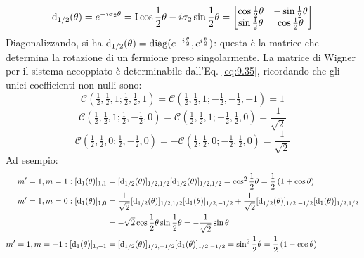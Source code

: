 \begin{equation*}
	\mathrm{d}_{1/2}(\theta) = e^{-i \sigma_2 \theta} = \mathrm{I} \cos \frac{1}{2} \theta - i \sigma_2 \sin \frac{1}{2} \theta =
	\begin{bmatrix}
		\cos \frac{1}{2} \theta & -\sin \frac{1}{2} \theta \\
		\sin \frac{1}{2} \theta & \cos \frac{1}{2} \theta
	\end{bmatrix}
\end{equation*}
Diagonalizzando, si ha $ \mathrm{d}_{1/2}(\theta) = \operatorname{diag} ( e^{- i \frac{\theta}{2}}, e^{i \frac{\theta}{2}} ) $: questa è la matrice che determina la rotazione di un fermione preso singolarmente. La matrice di Wigner per il sistema accoppiato è determinabile dall'Eq. \ref{eq:9.35}, ricordando che gli unici coefficienti non nulli sono:
\begin{equation*}
	\mathcal{C}(\tfrac{1}{2},\tfrac{1}{2},1 ; \tfrac{1}{2},\tfrac{1}{2},1) = \mathcal{C}(\tfrac{1}{2},\tfrac{1}{2},1 ; -\tfrac{1}{2},-\tfrac{1}{2},-1) = 1
\end{equation*}
\begin{equation*}
	\mathcal{C}(\tfrac{1}{2},\tfrac{1}{2},1 ; \tfrac{1}{2},-\tfrac{1}{2},0) = \mathcal{C}(\tfrac{1}{2},\tfrac{1}{2},1 ; -\tfrac{1}{2},\tfrac{1}{2},0) = \frac{1}{\sqrt{2}}
\end{equation*}
\begin{equation*}
	\mathcal{C}(\tfrac{1}{2},\tfrac{1}{2},0 ; \tfrac{1}{2},-\tfrac{1}{2},0) = - \mathcal{C}(\tfrac{1}{2},\tfrac{1}{2},0 ; -\tfrac{1}{2},\tfrac{1}{2},0) = \frac{1}{\sqrt{2}}
\end{equation*}
Ad esempio:
\begin{align*}
	m' = 1, m = 1: [\mathrm{d}_1(\theta)]_{1,1} &= [\mathrm{d}_{1/2}(\theta)]_{1/2,1/2} [\mathrm{d}_{1/2}(\theta)]_{1/2,1/2} = \cos^2 \frac{1}{2} \theta = \frac{1}{2} \left( 1 + \cos \theta \right) \\
	m' = 1, m = 0: [\mathrm{d}_1(\theta)]_{1,0} &= \frac{1}{\sqrt{2}} [\mathrm{d}_{1/2}(\theta)]_{1/2,1/2} [\mathrm{d}_1(\theta)]_{1/2,-1/2} + \frac{1}{\sqrt{2}} [\mathrm{d}_{1/2}(\theta)]_{1/2,-1/2} [\mathrm{d}_1(\theta)]_{1/2,1/2} \\
						  &= - \sqrt{2} \cos \frac{1}{2} \theta \sin \frac{1}{2} \theta = - \frac{1}{\sqrt{2}} \sin \theta \\
	m' = 1, m = -1: [\mathrm{d}_1(\theta)]_{1,-1} &= [\mathrm{d}_{1/2}(\theta)]_{1/2,-1/2} [\mathrm{d}_1(\theta)]_{1/2,-1/2} = \sin^2 \frac{1}{2} \theta = \frac{1}{2} \left( 1 - \cos \theta \right)
\end{align*}
